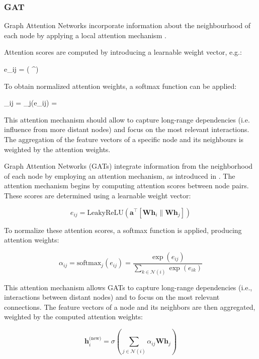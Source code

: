\subsubsection{GAT}

Graph Attention Networks incorporate information about the neighbourhood of each node by applying a local attention mechanism \cite{Velickovic.30.10.2017}.


Attention scores are computed by introducing a learnable weight vector, e.g.:

e_{ij} = \left( ^\top {} \right)

To obtain normalized attention weights, a softmax function can be applied:



\alpha_{ij} = _j(e_{ij}) = 

This attention mechanism should allow to capture long-range dependencies (i.e. influence from more distant nodes) and focus on the most relevant interactions.
The aggregation of the feature vectors of a specific node and its neighbours is weighted by the attention weights.

Graph Attention Networks (GATs) integrate information from the neighborhood of each node by employing an attention mechanism, as introduced in \cite{Velickovic.30.10.2017}. The attention mechanism begins by computing attention scores between node pairs. These scores are determined using a learnable weight vector:

\[
e_{ij} = \text{LeakyReLU}\left( \mathbf{a}^\top \left[ \mathbf{W} \mathbf{h}_i \parallel \mathbf{W} \mathbf{h}_j \right] \right)
\]

To normalize these attention scores, a softmax function is applied, producing attention weights:

\[
\alpha_{ij} = \text{softmax}_j(e_{ij}) = \frac{\exp(e_{ij})}{\sum_{k \in \mathcal{N}(i)} \exp(e_{ik})}
\]

This attention mechanism allows GATs to capture long-range dependencies (i.e., interactions between distant nodes) and to focus on the most relevant connections. The feature vectors of a node and its neighbors are then aggregated, weighted by the computed attention weights:

\[
\mathbf{h}_i^{\text{(new)}} = \sigma \left( \sum_{j \in \mathcal{N}(i)} \alpha_{ij} \mathbf{W} \mathbf{h}_j \right)
\]


